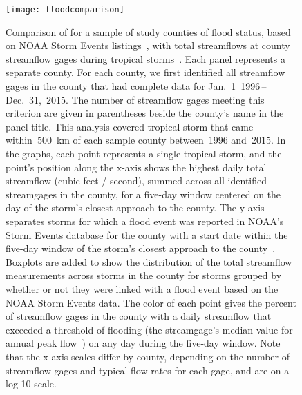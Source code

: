 \begin{figure}[tbhp!]
\centering
\texttt{[image: floodcomparison]}
\caption{Comparison of for a sample of study counties of flood status, based on
NOAA Storm Events listings~\parencite{stormevents, noaastormevents}, with total
streamflows at county streamflow gages during tropical storms~\parencite{usgsgages,
countyfloods, dataRetrieval}. Each panel represents a separate county. For each
county, we first identified all streamflow gages in the county that had
complete data for Jan.~1~1996\,--\,Dec.~31,~2015. The number of streamflow
gages meeting this criterion are given in parentheses beside the county's name
in the panel title. This analysis covered tropical storm that came
within~500~\si{\kilo\metre} of each sample county between~1996 and~2015. In the
graphs, each point represents a single tropical storm, and the point's position
along the x-axis shows the highest daily total streamflow (cubic feet /
second), summed across all identified streamgages in the county, for a five-day
window centered on the day of the storm's closest approach to the county. The
y-axis separates storms for which a flood event was reported in NOAA's Storm
Events database for the county with a start date within the five-day window of
the storm's closest approach to the county~\parencite{stormevents,
noaastormevents}. Boxplots are added to show the distribution of the total
streamflow measurements across storms in the county for storms grouped by
whether or not they were linked with a flood event based on the NOAA Storm
Events data. The color of each point gives the percent of streamflow gages in
the county with a daily streamflow that exceeded a threshold of flooding (the
streamgage's median value for annual peak flow~\parencite{countyfloods}) on any day
during the five-day window.  Note that the x-axis scales differ by county,
depending on the number of streamflow gages and typical flow rates for each
gage, and are on a log-10 scale.}
\label{fig:floodcomparison}
\end{figure}


